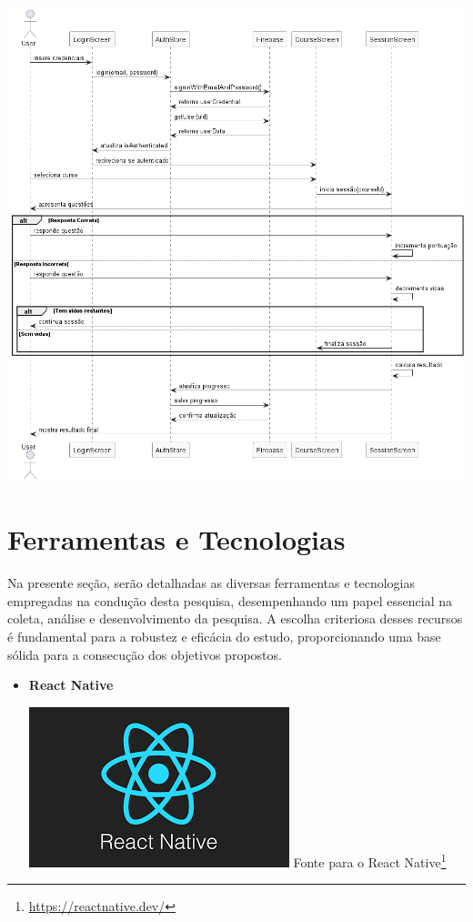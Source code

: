 \begin{itemize}
\begin{center}
\includegraphics[width=\linewidth]{figuras/DiagramsUMLs/Math Pow Sequence.png}
\label{fig:diagrama-de-sequencia}
\end{center}

\section{Ferramentas e Tecnologias}

Na presente seção, serão detalhadas as diversas ferramentas e tecnologias empregadas na condução desta pesquisa, desempenhando um papel essencial na coleta, análise e desenvolvimento da pesquisa. A escolha criteriosa desses recursos é fundamental para a robustez e eficácia do estudo, proporcionando uma base sólida para a consecução dos objetivos propostos.

\begin{itemize}

    \item \textbf{React Native} 
    \begin{center}
    \includegraphics[width=0.5\linewidth]{figuras/Tecnologies/React Native.png}
    \label{fig:React Native}
    Fonte para o React Native\footnote{\url{https://reactnative.dev/}}
\end{center}


\end{itemize}
\end{itemize}
